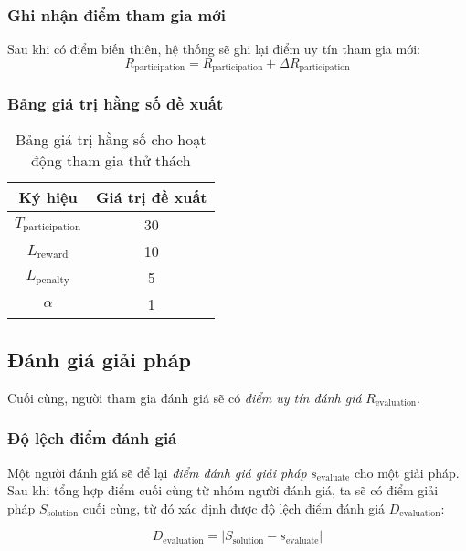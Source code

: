 \subsubsection{Ghi nhận điểm tham gia mới}

Sau khi có điểm biến thiên, hệ thống sẽ ghi lại điểm uy tín tham gia mới:
\[R_{\text{participation}} = R_{\text{participation}} + \Delta R_{\text{participation}}\]

\subsubsection{Bảng giá trị hằng số đề xuất}

\begin{table}[H]
  \centering
  \begin{tabular}{|c|c|}
    \hline
    \textbf{Ký hiệu}           & \textbf{Giá trị đề xuất} \\ \hline
    $T_{\text{participation}}$ & 30                       \\ \hline
    $L_{\text{reward}}$        & 10                       \\ \hline
    $L_{\text{penalty}}$       & 5                        \\ \hline
    $\alpha$                   & 1                        \\ \hline
  \end{tabular}
  \caption{Bảng giá trị hằng số cho hoạt động tham gia thử thách}
  \label{tab:suggested-constant-values-for-participation}
\end{table}

\subsection{Đánh giá giải pháp}

Cuối cùng, người tham gia đánh giá sẽ có \textit{điểm uy tín đánh giá} $R_{\text{evaluation}}$.

\subsubsection{Độ lệch điểm đánh giá}

Một người đánh giá sẽ để lại \textit{điểm đánh giá giải pháp} $s_{\text{evaluate}}$ cho một giải pháp. Sau khi tổng hợp điểm cuối cùng từ nhóm người đánh giá,
ta sẽ có điểm giải pháp $S_{\text{solution}}$ cuối cùng, từ đó xác định được độ lệch điểm đánh giá $D_{\text{evaluation}}$:

\[D_{\text{evaluation}}=|S_{\text{solution}}-s_{\text{evaluate}}|\]

